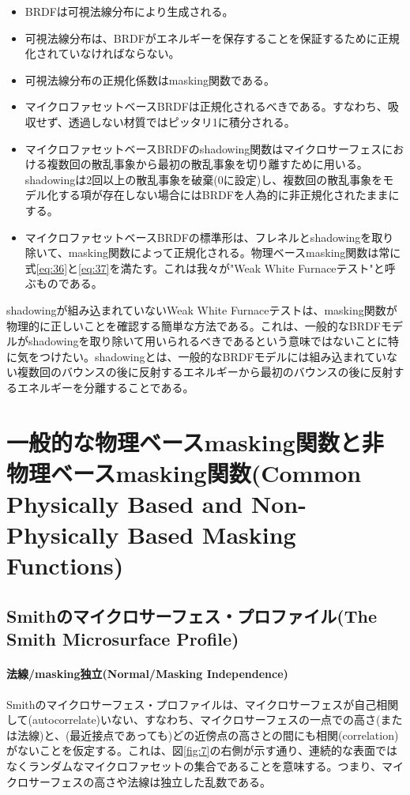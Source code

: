 \documentclass[a4j,xelatex,ja=standard]{bxjsarticle}
\begin{document}
\begin{itemize}
\item BRDFは可視法線分布により生成される。
\item 可視法線分布は、BRDFがエネルギーを保存することを保証するために正規化されていなければならない。
\item 可視法線分布の正規化係数はmasking関数である。
\item マイクロファセットベースBRDFは正規化されるべきである。すなわち、吸収せず、透過しない材質ではピッタリ1に積分される。
\item マイクロファセットベースBRDFのshadowing関数はマイクロサーフェスにおける複数回の散乱事象から最初の散乱事象を切り離すために用いる。shadowingは2回以上の散乱事象を破棄(0に設定)し、複数回の散乱事象をモデル化する項が存在しない場合にはBRDFを人為的に非正規化されたままにする。
\item マイクロファセットベースBRDFの標準形は、フレネルとshadowingを取り除いて、masking関数によって正規化される。物理ベースmasking関数は常に式\eqref{eq:36}と\eqref{eq:37}を満たす。これは我々が"Weak White Furnaceテスト"と呼ぶものである。
\end{itemize}

shadowingが組み込まれていないWeak White Furnaceテストは、masking関数が物理的に正しいことを確認する簡単な方法である。これは、一般的なBRDFモデルがshadowingを取り除いて用いられるべきであるという意味ではないことに特に気をつけたい。shadowingとは、一般的なBRDFモデルには組み込まれていない複数回のバウンスの後に反射するエネルギーから最初のバウンスの後に反射するエネルギーを分離することである。

\section{一般的な物理ベースmasking関数と非物理ベースmasking関数(Common Physically Based and Non-Physically Based Masking Functions)}

\subsection{Smithのマイクロサーフェス・プロファイル(The Smith Microsurface Profile)}
\label{sec:4.1}

\paragraph{法線/masking独立(Normal/Masking Independence)}

Smithのマイクロサーフェス・プロファイルは、マイクロサーフェスが自己相関して(autocorrelate)いない、すなわち、マイクロサーフェスの一点での高さ(または法線)と、(最近接点であっても)どの近傍点の高さとの間にも相関(correlation)がないことを仮定する。これは、図\ref{fig:7}の右側が示す通り、連続的な表面ではなくランダムなマイクロファセットの集合であることを意味する。つまり、マイクロサーフェスの高さや法線は独立した乱数である。
\end{document}
